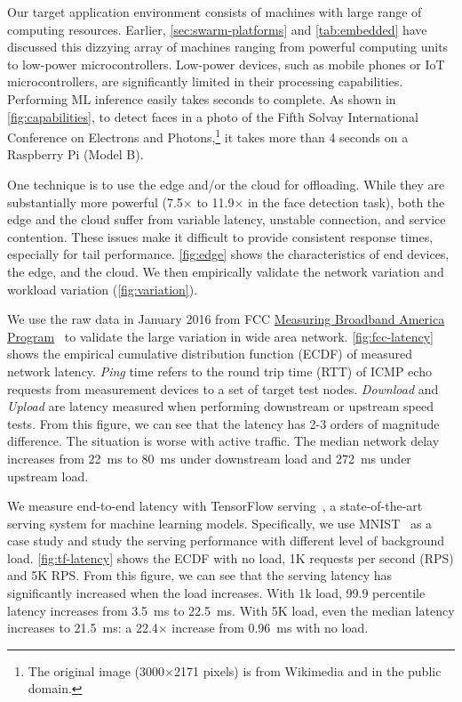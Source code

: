 Our target application environment consists of machines with large range of
computing resources. Earlier, \autoref{sec:swarm-platforms} and
\autoref{tab:embedded} have discussed this dizzying array of machines ranging
from powerful computing units to low-power microcontrollers.  Low-power devices,
such as mobile phones or IoT microcontrollers, are significantly limited in
their processing capabilities. Performing ML inference easily takes seconds to
complete. As shown in \autoref{fig:capabilities}, to detect faces in a photo of
the Fifth Solvay International Conference on Electrons and Photons,\footnote{The
  original image (3000$\times$2171 pixels) is from Wikimedia and in the public
  domain.} it takes more than 4 seconds on a Raspberry Pi (Model B).

One technique is to use the edge and/or the cloud for offloading. While they are
substantially more powerful (7.5$\times$ to 11.9$\times$ in the face detection
task), both the edge and the cloud suffer from variable latency, unstable
connection, and service contention. These issues make it difficult to provide
consistent response times, especially for tail performance. \autoref{fig:edge}
shows the characteristics of end devices, the edge, and the cloud. We then
empirically validate the network variation and workload variation
(\autoref{fig:variation}).

 We use the raw data in January 2016 from FCC
\href{https://www.fcc.gov/general/measuring-broadband-america}{Measuring
  Broadband America Program}~\cite{fcc} to validate the large variation in wide
area network. \autoref{fig:fcc-latency} shows the empirical cumulative
distribution function (ECDF) of measured network latency. \textit{Ping} time refers to
the round trip time (RTT) of ICMP echo requests from measurement devices to a
set of target test nodes. \textit{Download} and \textit{Upload} are latency
measured when performing downstream or upstream speed tests. From this figure,
we can see that the latency has 2-3 orders of magnitude difference. The
situation is worse with active traffic. The median network delay increases from
\SI{22}{\ms} to \SI{80}{\ms} under downstream load and \SI{272}{\ms} under
upstream load.

 \noindent We measure end-to-end latency with
TensorFlow serving~\cite{olston2017tensorflow}, a state-of-the-art serving
system for machine learning models. Specifically, we use
MNIST~\cite{lecun1998mnist} as a case study and study the serving performance
with different level of background load. \autoref{fig:tf-latency} shows the ECDF
with no load, 1K requests per second (RPS) and 5K RPS. From this figure, we can
see that the serving latency has significantly increased when the load
increases. With 1k load, 99.9 percentile latency increases from \SI{3.5}{\ms} to
\SI{22.5}{\ms}. With 5K load, even the median latency increases to
\SI{21.5}{\ms}: a 22.4$\times$ increase from \SI{0.96}{\ms} with no load.

